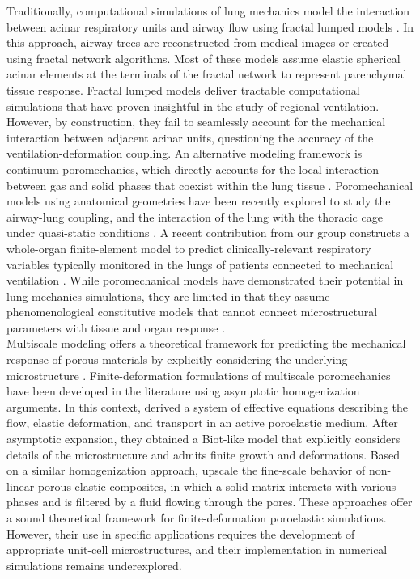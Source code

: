 \documentclass[preprint,3p,12pt,number,sort&compress]{elsarticle}
\begin{document}
Traditionally, computational simulations of lung mechanics model the interaction between acinar respiratory units and airway flow using fractal lumped models \cite{pozin2017tree,roth2017comprehensive,roth2017computational,swan2012computational,tawhai2011multi}. In this approach, airway trees are reconstructed from medical images or created using fractal network algorithms. Most of these models assume elastic spherical acinar elements at the terminals of the fractal network to represent parenchymal tissue response. Fractal lumped models deliver tractable computational simulations that have proven insightful in the study of regional ventilation. However, by construction, they fail to seamlessly account for the mechanical interaction between adjacent acinar units, questioning the accuracy of the ventilation-deformation coupling. An alternative modeling framework is continuum poromechanics, which directly accounts for the local interaction between gas and solid phases that coexist within the lung tissue \cite{kowalczyk1993mechanical}. Poromechanical models using anatomical geometries have been recently explored to study the airway-lung coupling\cite{berger2016poroelastic}, and the interaction of the lung with the thoracic cage under quasi-static conditions \cite{PatteEtal2022}. A recent contribution from our group constructs a whole-organ finite-element model to predict clinically-relevant respiratory variables typically monitored in the lungs of patients connected to mechanical ventilation \cite{avileshurtado2022whole}. While poromechanical models have demonstrated their potential in lung mechanics simulations, they are limited in that they assume phenomenological constitutive models that cannot connect microstructural parameters with tissue and organ response \cite{ConchaEtal2018}.\\

Multiscale modeling offers a theoretical framework for predicting the mechanical response of porous materials by explicitly considering the underlying microstructure \cite{burridge1981poroelasticity,levy1979propagation,penta2014effective}. Finite-deformation formulations of multiscale poromechanics have been developed in the literature using asymptotic homogenization arguments. In this context, \citet{CollisEtAl2017} derived a system of effective equations describing the flow, elastic deformation, and transport in an active poroelastic medium. After asymptotic expansion, they obtained a Biot-like \cite{biot1941general,biot1955theory} model that explicitly considers details of the microstructure and admits finite growth and deformations. Based on a similar homogenization approach, \citet{miller2021homogenized} upscale the fine-scale behavior of non-linear porous elastic composites, in which a solid matrix interacts with various phases and is filtered by a fluid flowing through the pores. These approaches offer a sound theoretical framework for finite-deformation poroelastic simulations. However, their use in specific applications requires the development of appropriate unit-cell microstructures, and their implementation in numerical simulations remains underexplored.\\
\end{document}
